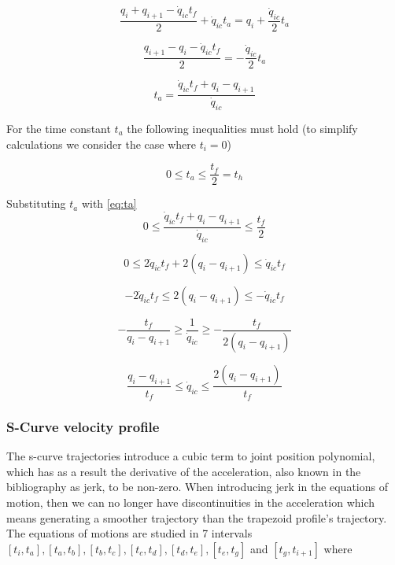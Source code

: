 \begin{equation}
\frac{q_i + q_{i+1} - \dot{q}_{ic}t_f}{2} + \dot{q}_{ic}t_a = q_i + \frac{\dot{q}_{ic}}{2}t_a
\end{equation}

\begin{equation}
\frac{q_{i+1} - q_i - \dot{q}_{ic}t_f}{2} = -\frac{\dot{q}_{ic}}{2}t_a
\end{equation}

\begin{equation}
\label{eq:ta}
t_a = \frac{\dot{q}_{ic}t_f + q_i - q_{i+1}}{\dot{q}_{ic}}
\end{equation}

For the time constant $t_a$ the following inequalities must hold (to simplify calculations we consider the case where $t_i = 0$)

\begin{equation}
0 \leq t_a \leq \frac{t_f}{2} = t_h
\end{equation}

Substituting $t_a$ with \ref{eq:ta}
\begin{equation}
0 \leq \frac{\dot{q}_{ic}t_f + q_i - q_{i+1}}{\dot{q}_{ic}} \leq \frac{t_f}{2}
\end{equation}

\begin{equation}
0 \leq 2\dot{q}_{ic}t_f + 2(q_i-q_{i+1}) \leq \dot{q}_{ic}t_f
\end{equation}

\begin{equation}
-2\dot{q}_{ic}t_f \leq 2(q_i - q_{i+1}) \leq -\dot{q}_{ic}t_f
\end{equation}

\begin{equation}
- \frac{t_f}{q_i - q_{i+1}} \geq \frac{1}{\dot{q}_{ic}} \geq -\frac{t_f}{2(q_i - q_{i+1})}
\end{equation}

\begin{equation}
\frac{q_i - q_{i+1}}{t_f} \leq \dot{q}_{ic} \leq \frac{2(q_i - q_{i+1})}{t_f}
\end{equation}


\subsubsection{S-Curve velocity profile}

The s-curve trajectories introduce a cubic term to joint position polynomial, which has as a result the derivative of the acceleration, also known in the bibliography as jerk, to be non-zero. When introducing jerk
in the equations of motion, then we can no longer have discontinuities in the acceleration which means generating a smoother trajectory than the trapezoid profile's trajectory. The equations of motions are studied 
in 7 intervals $[t_i, t_a], [t_a, t_b], [t_b, t_c], [t_c, t_d], [t_d, t_e], [t_e, t_g]$ and $[t_g, t_{i+1}]$ where 

